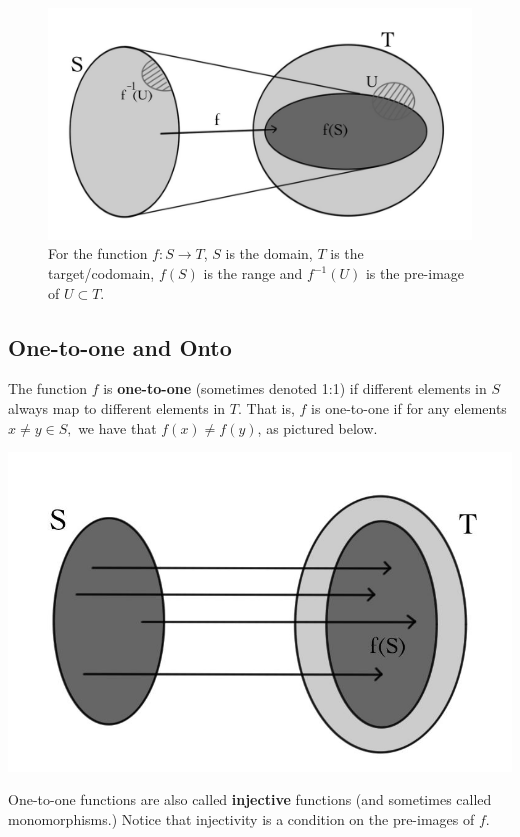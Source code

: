 \begin{figure}
\begin{center}
\includegraphics[scale=.25]{functions.jpg}
\end{center}
\caption{For the function $f:S\to T$, $S$ is the domain, $T$ is the target/codomain, $f(S)$ is the range and $f^{-1}(U)$ is the
pre-image of $U\subset T$.}
\end{figure}

\subsection{ One-to-one and Onto}
The function \(f\) is {\bf one-to-one} (sometimes denoted 1:1) if different elements in \(S\) always map to different elements in \(T\). That is, \(f\) is one-to-one if for any elements \(x \neq y \in S,\) we have that \(f(x) \neq f(y)\), as pictured below.
\begin{center}
\includegraphics[scale=.25]{121.jpg}
\end{center} 
One-to-one functions are also called {\bf injective} functions (and sometimes called monomorphisms.) Notice that injectivity is a condition on the pre-images of \(f\).

